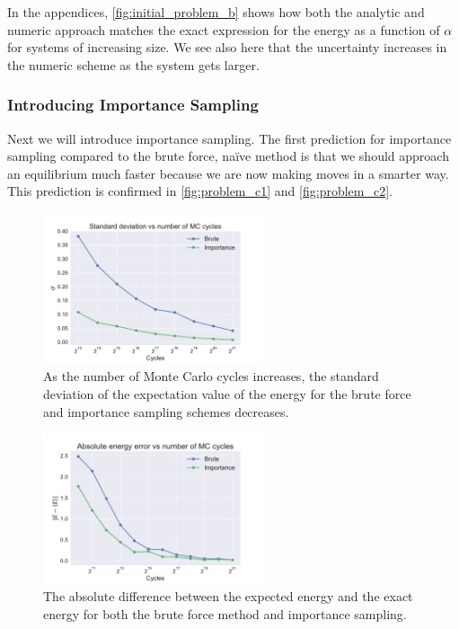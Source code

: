 \documentclass[
    a4paper, aps, twocolumn, floatfix, superscriptaddress,
    nofootinbib]{revtex4-1}
\newcommand{\1}{\mathds{1}}
\begin{document}
        In the appendices,  \autoref{fig:initial_problem_b} shows how both the
        analytic and numeric approach matches the exact expression for the
        energy as a function of $\alpha$ for systems of increasing size.  We see
        also here that the uncertainty increases in the numeric scheme as the
        system gets larger.

        \subsubsection{Introducing Importance Sampling}
            Next we will introduce importance sampling. The first prediction for
            importance sampling compared to the brute force, naïve method is
            that we should approach an equilibrium much faster because we are
            now making moves in a smarter way. This prediction is confirmed in
            \autoref{fig:problem_c1} and \autoref{fig:problem_c2}.

            \begin{figure}
                \centering
                    \includegraphics[width=244px]
                    {../data/figures/problem_c1.pdf}
                    \caption{As the number of Monte Carlo cycles increases, the
                    standard deviation of the expectation value of the energy
                    for the brute force and importance sampling schemes
                    decreases.}
                    \label{fig:problem_c1}
            \end{figure}

            \begin{figure}
                \centering
                    \includegraphics[width=244px]
                    {../data/figures/problem_c2.pdf}
                    \caption{The absolute difference between the expected energy
                    and the exact energy for both the brute force method and
                    importance sampling.}
                    \label{fig:problem_c2}
            \end{figure}
\end{document}
